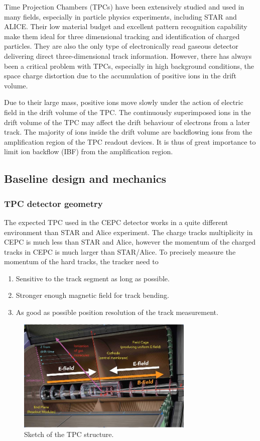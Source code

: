 Time Projection Chambers (TPCs) have been extensively studied and used in many fields, especially in particle physics experiments, including STAR and ALICE. Their low material budget and excellent pattern recognition capability make them ideal for three dimensional tracking and identification of charged particles. They are also the only type of electronically read gaseous detector delivering direct three-dimensional track information. However, there has always been a critical problem with TPCs, especially in high background conditions, the space charge distortion due to the accumulation of positive ions in the drift volume.

Due to their large mass, positive ions move slowly under the action of electric field in the drift volume of the TPC. The continuously superimposed ions in the drift volume of the TPC may affect the drift behaviour of electrons from a later track. The majority of ions inside the drift volume are backflowing ions from the amplification region of the TPC readout devices. It is thus of great importance to limit ion backflow (IBF) from the amplification region.

\subsection{Baseline design and mechanics}

\subsubsection{TPC detector geometry}
The expected TPC used in the CEPC detector works in a quite different environment than STAR and Alice experiment. The charge tracks multiplicity in CEPC is much less than STAR and Alice, however the momentum of the charged tracks in CEPC is much larger than STAR/Alice.
To precisely measure the momentum of the hard tracks, the tracker need to

\begin{enumerate}
\item	Sensitive to the track segment as long as possible.
\item	Stronger enough magnetic field for track bending.
\item	As good as possible position resolution of the track measurement.
\end{enumerate}

\begin{figure}[htbp]
\centering
\includegraphics[width=0.75\textwidth]{figures/TrackingSystem/TPC_img5.jpg}
\caption{\label{fig:img5} Sketch of the TPC structure.}
\end{figure}

